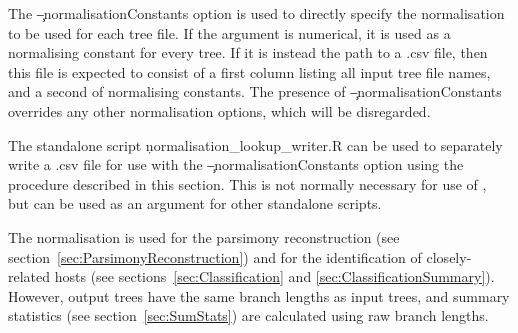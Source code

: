 The \c{--normalisationConstants} option is used to directly specify the normalisation to be used for each tree file.
If the argument is numerical, it is used as a normalising constant for every tree.
If it is instead the path to a .csv file, then this file is expected to consist of a first column listing all input tree file names, and a second of normalising constants.
The presence of \c{--normalisationConstants} overrides any other normalisation options, which will be disregarded.

The standalone script \c{normalisation\_lookup\_writer.R} can be used to separately write a .csv file for use with the \c{--normalisationConstants} option using the procedure described in this section. This is not normally necessary for use of \pat, but can be used as an argument for other standalone scripts.

The normalisation is used for the parsimony reconstruction (see section~\ref{sec:ParsimonyReconstruction}) and for the identification of closely-related hosts (see sections~\ref{sec:Classification} and \ref{sec:ClassificationSummary}). However, output trees have the same branch lengths as input trees, and summary statistics (see section~\ref{sec:SumStats}) are calculated using raw branch lengths.

